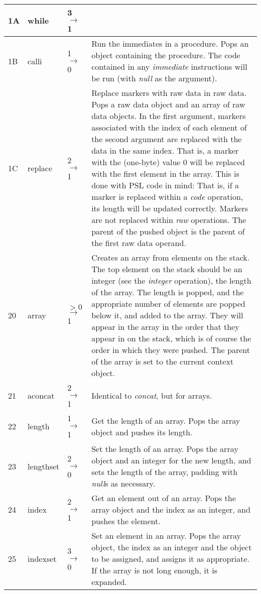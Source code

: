 \begin{longtable}{ | l | l | l | X | }
\hline
1A & while & 3 $\rightarrow$ 1 &  \\
\hline
1B & calli & 1 $\rightarrow$ 0 & Run the immediates in a procedure. Pops an object containing the procedure. The code contained in any \textit{immediate} instructions will be run (with \textit{null} as the argument). \\
\hline
1C & replace & 2 $\rightarrow$ 1 & Replace markers with raw data in raw data. Pops a raw data object and an array of raw data objects. In the first argument, markers associated with the index of each element of the second argument are replaced with the data in the same index. That is, a marker with the (one-byte) value 0 will be replaced with the first element in the array. This is done with PSL code in mind: That is, if a marker is replaced within a \textit{code} operation, its length will be updated correctly. Markers are not replaced within \textit{raw} operations. The parent of the pushed object is the parent of the first raw data operand. \\
\hline
20 & array & $>0$ $\rightarrow$ 1 & Creates an array from elements on the stack. The top element on the stack should be an integer (see the \textit{integer} operation), the length of the array. The length is popped, and the appropriate number of elements are popped below it, and added to the array. They will appear in the array in the order that they appear in on the stack, which is of course the order in which they were pushed. The parent of the array is set to the current context object. \\
\hline
21 & aconcat & 2 $\rightarrow$ 1 & Identical to \textit{concat}, but for arrays. \\
\hline
22 & length & 1 $\rightarrow$ 1 & Get the length of an array. Pops the array object and pushes its length. \\
\hline
23 & lengthset & 2 $\rightarrow$ 0 & Set the length of an array. Pops the array object and an integer for the new length, and sets the length of the array, padding with \textit{null}s as necessary. \\
\hline
24 & index & 2 $\rightarrow$ 1 & Get an element out of an array. Pops the array object and the index as an integer, and pushes the element. \\
\hline
25 & indexset & 3 $\rightarrow$ 0 & Set an element in an array. Pops the array object, the index as an integer and the object to be assigned, and assigns it as appropriate. If the array is not long enough, it is expanded. \\

\end{longtable}
